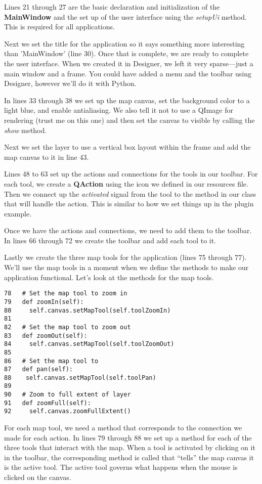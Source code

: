 Lines 21 through 27 are the basic declaration and initialization of the 
\textbf{MainWindow} and the set up of the user interface using the 
\textsl{setupUi} method. This is required for all applications.

Next we set the title for the application so it says something more
interesting than 'MainWindow' (line 30). Once that is
complete, we are ready to complete the user interface. When we created it in
Designer, we left it very sparse---just a main window and a frame. You could
have added a menu and the toolbar using Designer, however we'll do it with
Python.

In lines 33 through 38 we set up the map
canvas, set the background color to a light blue, and enable antialiasing.
We also tell it not to use a QImage for rendering (trust me on this one) and
then set the canvas to visible by calling the \textsl{show} method.

Next we set the layer to use a vertical box layout within the frame and add the map
canvas to it in line 43.

Lines 48 to 63 set up the actions and connections for the tools in our 
toolbar. For each tool, we create a
\textbf{QAction} using the icon we defined in our resources file. Then we
connect up the \textsl{activated} signal from the tool to the method in our
class that will handle the action. This is similar to how we set things up
in the plugin example.

Once we have the actions and connections, we need to add them to the
toolbar. In lines 66 through 72 we create the
toolbar and add each tool to it.

Lastly we create the three map tools for the application (lines
75 through 77). We'll use the map tools in a
moment when we define the methods to make our application functional. Let's
look at the methods for the map tools.

\begin{verbatim}
78   # Set the map tool to zoom in
79   def zoomIn(self):
80     self.canvas.setMapTool(self.toolZoomIn)
81 
82   # Set the map tool to zoom out
83   def zoomOut(self):
84     self.canvas.setMapTool(self.toolZoomOut)
85 
86   # Set the map tool to 
87   def pan(self):
88    self.canvas.setMapTool(self.toolPan)
89 
90   # Zoom to full extent of layer
91   def zoomFull(self):
92     self.canvas.zoomFullExtent()
\end{verbatim}

For each map tool, we need a method that corresponds to the connection we
made for each action. In lines 79 through 88 we set up a method for each 
of the three tools that
interact with the map. When a tool is activated by clicking on it in the
toolbar, the corresponding method is called that ``tells'' the map canvas it
is the active tool. The active tool governs what happens when the mouse is
clicked on the canvas.

